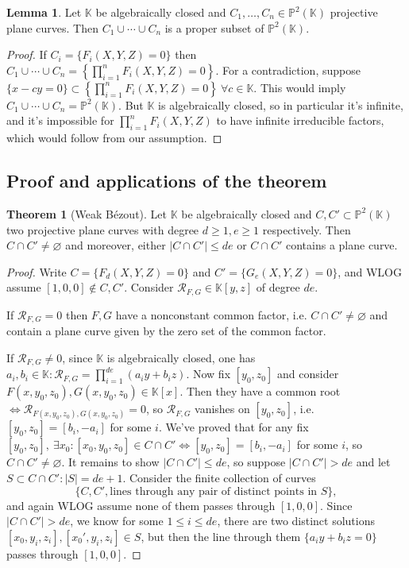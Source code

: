 \documentclass{article}
\newcommand{\K}{\mathbb{K}}
\newcommand{\p}{\mathbb{P}}
\newcommand{\re}{\mathcal{R}}
\theoremstyle{definition}
\newtheorem{thm}[defn]{Theorem}
\newtheorem{lemma}[defn]{Lemma}
\begin{document}
\begin{lemma}
Let $\K$ be algebraically closed and $C_1,\ldots,C_n\in\p^2(\K)$ projective plane curves. Then $C_1\cup\cdots\cup C_n$ is a proper subset of $\p^2(\K)$.
\end{lemma}
\begin{proof}
If $C_i=\{F_i(X,Y,Z)=0\}$ then $C_1\cup\cdots\cup C_n=\left\{\prod_{i=1}^n F_i(X,Y,Z)=0\right\}$. For a contradiction, suppose $\{x-cy=0\}\subset \left\{\prod_{i=1}^n F_i(X,Y,Z)=0\right\} \ \forall c\in\K$. This would imply $C_1\cup\cdots\cup C_n=\p^2(\K)$. But $\K$ is algebraically closed, so in particular it's infinite, and it's impossible for $\prod_{i=1}^n F_i(X,Y,Z)$ to have infinite irreducible factors, which would follow from our assumption.
\end{proof}

\subsection{Proof and applications of the theorem}
\begin{thm}[Weak Bézout]
\label{thm:weakBezout}
Let $\K$ be algebraically closed and $C,C'\subset\p^2(\K)$ two projective plane curves with degree $d\geq 1,e\geq 1$ respectively. Then $C\cap C'\neq\varnothing$ and moreover, either $|C\cap C'|\leq de$ or $C\cap C'$ contains a plane curve.
\end{thm}
\begin{proof}
Write $C=\{F_d(X,Y,Z)=0\}$ and $C'=\{G_e(X,Y,Z)=0\}$, and WLOG assume $[1,0,0]\notin C,C'$. Consider $\re_{F,G}\in\K[y,z]$ of degree $de$.

If $\re_{F,G}=0$ then $F,G$ have a nonconstant common factor, i.e. $C\cap C'\neq\varnothing$ and contain a plane curve given by the zero set of the common factor.

If $\re_{F,G}\neq 0$, since $\K$ is algebraically closed, one has $a_i,b_i\in\K:\re_{F,G}=\prod_{i=1}^{de}(a_iy+b_iz)$. Now fix $[y_0,z_0]$ and consider $F(x,y_0,z_0),G(x,y_0,z_0)\in\K[x]$. Then they have a common root $\iff\re_{F(x,y_0,z_0),G(x,y_0,z_0)}=0$, so $\re_{F,G}$ vanishes on $[y_0,z_0]$, i.e. $[y_0,z_0]=[b_i,-a_i]$ for some $i$. We've proved that for any fix $[y_0,z_0],\ \exists x_0:[x_0,y_0,z_0]\in C\cap C'\iff [y_0,z_0]=[b_i,-a_i]$ for some $i$, so $C\cap C'\neq\varnothing$. It remains to show $|C\cap C'|\leq de$, so suppose $|C\cap C'|>de$ and let $S\subset C\cap C':|S|=de+1$. Consider the finite collection of curves
\[
\{C,C',\text{lines through any pair of distinct points in }S\},
\]
and again WLOG assume none of them passes through $[1,0,0]$. Since $|C\cap C'|>de$, we know for some $1\leq i\leq de$, there are two distinct solutions $[x_0,y_i,z_i],[x_0',y_i,z_i]\in S$, but then the line through them $\{a_iy+b_iz=0\}$ passes through $[1,0,0]$.
\end{proof}
\end{document}
